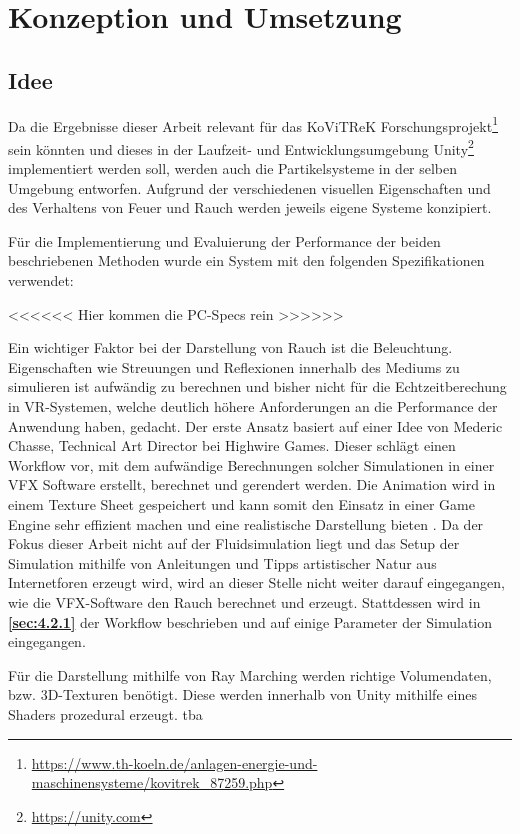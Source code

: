 \section{Konzeption und Umsetzung}
\label{sec:4}
\subsection{Idee}
\label{sec:4.1}

Da die Ergebnisse dieser Arbeit relevant für das KoViTReK Forschungsprojekt\footnote{\url{https://www.th-koeln.de/anlagen-energie-und-maschinensysteme/kovitrek\_87259.php}}
sein könnten und dieses in der Laufzeit- und Entwicklungsumgebung Unity\footnote{\url{https://unity.com}}
implementiert werden soll, werden auch die Partikelsysteme in der selben Umgebung entworfen.
Aufgrund der verschiedenen visuellen Eigenschaften und des Verhaltens von Feuer und Rauch werden jeweils eigene Systeme konzipiert.

Für die Implementierung und Evaluierung der Performance der beiden beschriebenen Methoden wurde ein System mit den folgenden Spezifikationen verwendet:

<<<<<< Hier kommen die PC-Specs rein >>>>>>

Ein wichtiger Faktor bei der Darstellung von Rauch ist die Beleuchtung. Eigenschaften wie Streuungen und Reflexionen innerhalb des Mediums zu simulieren ist
aufwändig zu berechnen und bisher nicht für die Echtzeitberechung in VR-Systemen, welche deutlich höhere Anforderungen an die Performance der Anwendung
haben, gedacht.
Der erste Ansatz basiert auf einer Idee von Mederic Chasse, Technical Art Director  bei Highwire Games.
Dieser schlägt einen Workflow vor, mit dem aufwändige Berechnungen solcher Simulationen in einer VFX Software erstellt, berechnet und gerendert werden.
Die Animation wird in einem Texture Sheet gespeichert und kann somit den Einsatz in einer Game Engine sehr effizient machen und eine realistische Darstellung bieten \parencite{Chasse2018}.
Da der Fokus dieser Arbeit nicht auf der Fluidsimulation liegt und das Setup der Simulation mithilfe von Anleitungen
und Tipps artistischer Natur aus Internetforen erzeugt wird, wird an dieser Stelle nicht weiter darauf eingegangen, wie die VFX-Software den Rauch berechnet und erzeugt.
Stattdessen wird in \textbf{\autoref{sec:4.2.1}} der Workflow beschrieben und auf einige Parameter der Simulation eingegangen.

Für die Darstellung mithilfe von Ray Marching werden richtige Volumendaten, bzw. 3D-Texturen benötigt. Diese werden innerhalb von Unity
mithilfe eines Shaders prozedural erzeugt. tba



